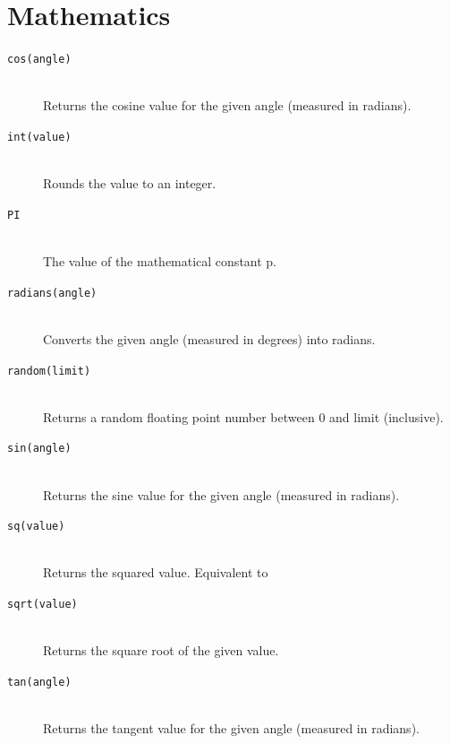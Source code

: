 \section{Mathematics}
\begin{description}
\item[\texttt{cos(angle)}] \hfill \\
	Returns the cosine value for the given angle (measured in radians).
\item[\texttt{int(value)}] \hfill \\
	Rounds the value to an integer.
\item[\texttt{PI}] \hfill \\
	The value of the mathematical constant p.
\item[\texttt{radians(angle)}] \hfill \\
	Converts the given angle (measured in degrees) into radians.
\item[\texttt{random(limit)}] \hfill \\
	Returns a random floating point number between 0 and limit (inclusive).
\item[\texttt{sin(angle)}] \hfill \\
	Returns the sine value for the given angle (measured in radians).
\item[\texttt{sq(value)}] \hfill \\
	Returns the squared value. Equivalent to 
\item[\texttt{sqrt(value)}] \hfill \\
	Returns the square root of the given value.
\item[\texttt{tan(angle)}] \hfill \\
	Returns the tangent value for the given angle (measured in radians).
\end{description}

